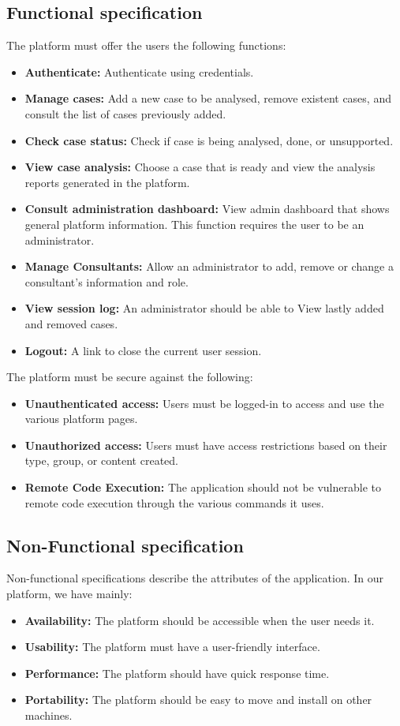 \subsection{Functional specification}
The platform must offer the users the following functions:
\begin{itemize}
    \item \textbf{Authenticate:} Authenticate using credentials.
    \item \textbf{Manage cases:} Add a new case to be analysed, remove existent cases, and consult the list of cases previously added.
    \item \textbf{Check case status:} Check if case is being analysed, done, or unsupported.
    \item \textbf{View case analysis:} Choose a case that is ready and view the analysis reports generated in the platform.
    \item \textbf{Consult administration dashboard:} View admin dashboard that shows general platform information. This function requires the user to be an administrator.
    \item \textbf{Manage Consultants:} Allow an administrator to add, remove or change a consultant's information and role.
    \item \textbf{View session log:} An administrator should be able to View lastly added and removed cases.
    \item \textbf{Logout:} A link to close the current user session.
\end{itemize}
The platform must be secure against the following:
\begin{itemize}
    \item \textbf{Unauthenticated access:} Users must be logged-in to access and use the various platform pages.
    \item \textbf{Unauthorized access:} Users must have access restrictions based on their type, group, or content created.
    \item \textbf{Remote Code Execution:} The application should not be vulnerable to remote code execution through the various commands it uses.
\end{itemize}
\subsection{Non-Functional specification}
Non-functional specifications describe the attributes of the application. In our platform, we have mainly:
\begin{itemize}
    \item \textbf{Availability:} The platform should be accessible when the user needs it.
    \item \textbf{Usability:} The platform must have a user-friendly interface.
    \item \textbf{Performance:} The platform should have quick response time.
    \item \textbf{Portability:} The platform should be easy to move and install on other machines.
\end{itemize}

